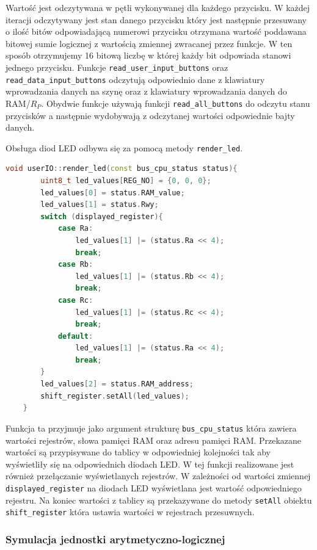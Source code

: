 \documentclass[../main.tex]{subfiles}
\begin{document}
Wartość jest odczytywana w pętli wykonywanej dla każdego przycisku. W każdej iteracji odczytywany jest stan danego przycisku który
jest następnie przesuwany o ilość bitów odpowiadającą numerowi przycisku otrzymana wartość poddawana bitowej sumie logicznej z wartością zmiennej
zwracanej przez funkcje. W ten sposób otrzymujemy 16 bitową liczbę w której każdy bit odpowiada stanowi jednego przycisku.
Funkcje \texttt{read\_user\_input\_buttons} oraz \texttt{read\_data\_input\_buttons} odczytują odpowiednio dane
z klawiatury wprowadzania danych na szynę oraz z klawiatury wprowadzania danych do RAM/$R_P$. Obydwie funkcje używają funkcji \texttt{read\_all\_buttons}
do odczytu stanu przycisków a następnie wydobywają z odczytanej wartości odpowiednie bajty danych.
\par
Obsługa diod LED odbywa się za pomocą metody \texttt{render\_led}. 

\begin{lstlisting}[language=C++]
    void userIO::render_led(const bus_cpu_status status){
        uint8_t led_values[REG_NO] = {0, 0, 0};
        led_values[0] = status.RAM_value;
        led_values[1] = status.Rwy;
        switch (displayed_register){
            case Ra:
                led_values[1] |= (status.Ra << 4);
                break;
            case Rb:
                led_values[1] |= (status.Rb << 4);
                break;
            case Rc:
                led_values[1] |= (status.Rc << 4);
                break;
            default:
                led_values[1] |= (status.Ra << 4);
                break;
        }
        led_values[2] = status.RAM_address;
        shift_register.setAll(led_values);
    }
\end{lstlisting}

Funkcja ta przyjmuje jako argument strukturę \texttt{bus\_cpu\_status} która zawiera wartości rejestrów, słowa pamięci RAM oraz adresu pamięci RAM.
Przekazane wartości są przypisywane do tablicy w odpowiedniej kolejności tak aby wyświetliły się na odpowiednich diodach LED. W tej funkcji
realizowane jest również przełączanie wyświetlanych rejestrów. W zależności od wartości zmiennej \texttt{displayed\_register} na diodach LED
wyświetlana jest wartość odpowiedniego rejestru. Na koniec wartości z tablicy są przekazywane do metody \texttt{setAll} obiektu \texttt{shift\_register}
która ustawia wartości w rejestrach przesuwnych.

\subsubsection{Symulacja jednostki arytmetyczno-logicznej}
\end{document}
